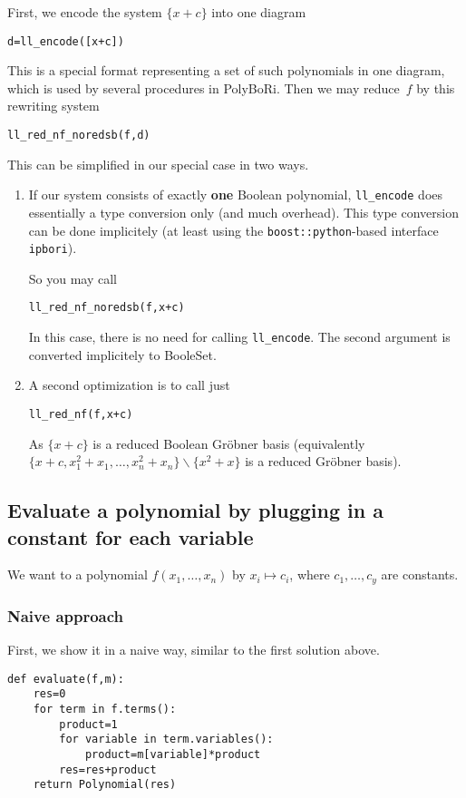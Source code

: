 \documentclass[]{article}
\newcommand{\PolyBoRi}{{\sc PolyBoRi}\xspace}
\newcommand{\Groebner}{Gr\"{o}bner\xspace}
\newcommand{\explfieldequations}{{x_1^2+x_1,\ldots,x_n^2+x_n}}
\begin{document}
First, we encode the system $\{x+c\}$ into one diagram
\begin{verbatim}
d=ll_encode([x+c])    
\end{verbatim}
%
This is a special format representing a set of such polynomials in one diagram, which is used by several procedures in
\PolyBoRi.
Then we may
reduce~$f$ by this rewriting system
\begin{verbatim}
ll_red_nf_noredsb(f,d)  
\end{verbatim}
%
%
This can be simplified in our special case in two ways.
\begin{enumerate}
    \item If our system consists of exactly \textbf{one} Boolean polynomial,
    \verb|ll_encode| does essentially  a type conversion only (and much overhead).
    This type conversion can be done implicitely (at least using the
\verb|boost::python|-based  interface \verb|ipbori|).

    So you may call
\begin{verbatim}
ll_red_nf_noredsb(f,x+c)  
\end{verbatim}
%
    In this case, there is no need for calling \verb|ll_encode|.
    The second argument is converted implicitely to BooleSet.
    \item A second optimization is to call just
\begin{verbatim}
ll_red_nf(f,x+c)
\end{verbatim}
    As $\{x+c\}$ is a reduced Boolean \Groebner basis (equivalently $\{x+c,\explfieldequations\}\backslash \{x^2+x\}$ is a reduced 
\Groebner 
basis).
\end{enumerate}



\subsection{Evaluate a polynomial by plugging in a constant for each variable}
    We want to a polynomial
    $f(x_1,\ldots, x_n)$
    by
    $x_i\mapsto c_i$, where
    $c_1,\ldots, c_y$ are constants.

\subsubsection{Naive approach}
First, we show it in a naive way, similar to the first solution above.

\begin{verbatim}
def evaluate(f,m):
    res=0
    for term in f.terms():
        product=1
        for variable in term.variables():
            product=m[variable]*product
        res=res+product
    return Polynomial(res)
\end{verbatim}
\end{document}
